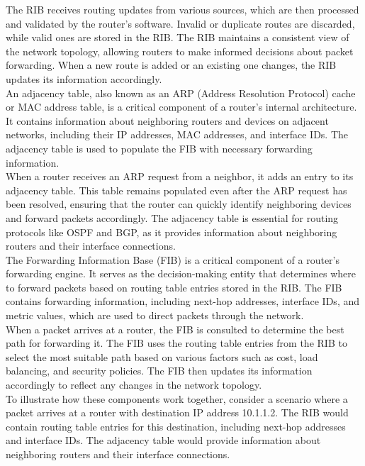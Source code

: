 \documentclass{article}
\begin{document}
The RIB receives routing updates from various sources, which are then processed and validated by the router's software. Invalid or duplicate routes are discarded, while valid ones are stored in the RIB. The RIB maintains a consistent view of the network topology, allowing routers to make informed decisions about packet forwarding. When a new route is added or an existing one changes, the RIB updates its information accordingly.\\

An adjacency table, also known as an ARP (Address Resolution Protocol) cache or MAC address table, is a critical component of a router's internal architecture. It contains information about neighboring routers and devices on adjacent networks, including their IP addresses, MAC addresses, and interface IDs. The adjacency table is used to populate the FIB with necessary forwarding information.\\

When a router receives an ARP request from a neighbor, it adds an entry to its adjacency table. This table remains populated even after the ARP request has been resolved, ensuring that the router can quickly identify neighboring devices and forward packets accordingly. The adjacency table is essential for routing protocols like OSPF and BGP, as it provides information about neighboring routers and their interface connections.\\

The Forwarding Information Base (FIB) is a critical component of a router's forwarding engine. It serves as the decision-making entity that determines where to forward packets based on routing table entries stored in the RIB. The FIB contains forwarding information, including next-hop addresses, interface IDs, and metric values, which are used to direct packets through the network.\\

When a packet arrives at a router, the FIB is consulted to determine the best path for forwarding it. The FIB uses the routing table entries from the RIB to select the most suitable path based on various factors such as cost, load balancing, and security policies. The FIB then updates its information accordingly to reflect any changes in the network topology.\\

To illustrate how these components work together, consider a scenario where a packet arrives at a router with destination IP address 10.1.1.2. The RIB would contain routing table entries for this destination, including next-hop addresses and interface IDs. The adjacency table would provide information about neighboring routers and their interface connections.\\
\end{document}
